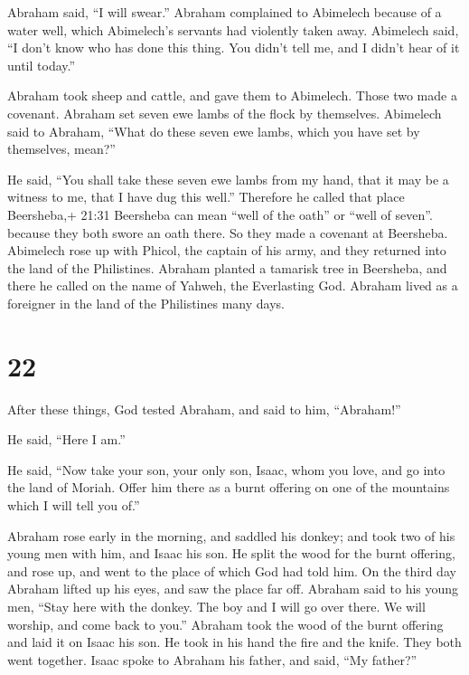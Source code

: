  Abraham said, ``I will swear.''  Abraham
complained to Abimelech because of a water well, which Abimelech's
servants had violently taken away.  Abimelech said, ``I
don't know who has done this thing. You didn't tell me, and I didn't
hear of it until today.''

 Abraham took sheep and cattle, and gave them to Abimelech.
Those two made a covenant.  Abraham set seven ewe lambs of
the flock by themselves.  Abimelech said to Abraham, ``What
do these seven ewe lambs, which you have set by themselves, mean?''

 He said, ``You shall take these seven ewe lambs from my
hand, that it may be a witness to me, that I have dug this well.''
 Therefore he called that place Beersheba,+ 21:31 Beersheba
can mean ``well of the oath'' or ``well of seven''. because they both
swore an oath there.  So they made a covenant at Beersheba.
Abimelech rose up with Phicol, the captain of his army, and they
returned into the land of the Philistines.  Abraham planted
a tamarisk tree in Beersheba, and there he called on the name of Yahweh,
the Everlasting God.  Abraham lived as a foreigner in the
land of the Philistines many days.

\hypertarget{section-21}{%
\section{22}\label{section-21}}

 After these things, God tested Abraham, and said to him,
``Abraham!''

He said, ``Here I am.''

 He said, ``Now take your son, your only son, Isaac, whom
you love, and go into the land of Moriah. Offer him there as a burnt
offering on one of the mountains which I will tell you of.''

 Abraham rose early in the morning, and saddled his donkey;
and took two of his young men with him, and Isaac his son. He split the
wood for the burnt offering, and rose up, and went to the place of which
God had told him.  On the third day Abraham lifted up his
eyes, and saw the place far off.  Abraham said to his young
men, ``Stay here with the donkey. The boy and I will go over there. We
will worship, and come back to you.''  Abraham took the wood
of the burnt offering and laid it on Isaac his son. He took in his hand
the fire and the knife. They both went together.  Isaac
spoke to Abraham his father, and said, ``My father?''


